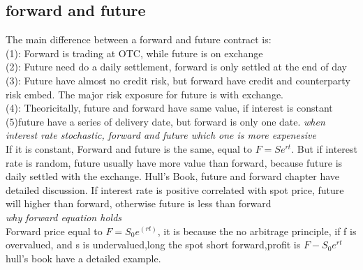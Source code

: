\documentclass[a4paper,11pt]{article}
\begin{document}
\subsection{forward and future}
The main difference between a forward and future contract is:\\
(1): Forward is trading at OTC, while future is on exchange\\
(2): Future need do a daily settlement, forward is only settled at the end of day\\
(3): Future have almost no credit risk, but forward have credit and counterparty risk embed. The major risk exposure for future is with exchange. \\
(4): Theoricitally, future and forward have same value, if interest is constant\\
(5)future have a series of delivery date, but forward is only one date.
{\em when interest rate stochastic, forward and future which one is more expenesive}\\
If it is constant, Forward and future is the same, equal to $F=Se^{rt}$. But if interest rate is random, future usually have more value than forward, because future is daily settled with the exchange. Hull's Book, future and forward chapter have detailed discussion. If interest rate is positive correlated with spot price, future will higher than forward, otherwise future is less than forward\\
{\em why forward equation holds}\\
Forward price equal to $F=S_0e^{(rt)}$, it is because the no arbitrage principle, if f is overvalued, and s is undervalued,long the spot short forward,profit is $F-S_0e^{rt}$ hull's book have a detailed example.
\end{document}
